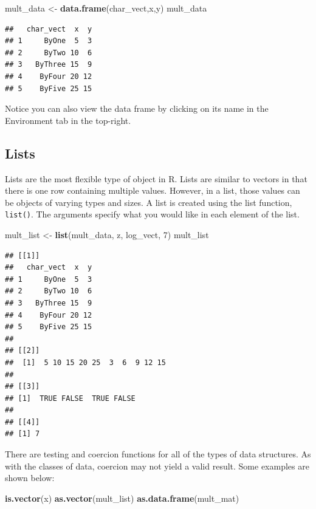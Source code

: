 \documentclass[
]{book}
\newenvironment{Shaded}{\begin{snugshade}}{\end{snugshade}}
\newcommand{\DecValTok}[1]{\textcolor[rgb]{0.00,0.00,0.81}{#1}}
\newcommand{\FunctionTok}[1]{\textcolor[rgb]{0.13,0.29,0.53}{\textbf{#1}}}
\newcommand{\NormalTok}[1]{#1}
\newcommand{\OtherTok}[1]{\textcolor[rgb]{0.56,0.35,0.01}{#1}}
\theoremstyle{definition}
\theoremstyle{definition}
\theoremstyle{definition}
\theoremstyle{definition}
\theoremstyle{remark}
\begin{document}
\begin{Shaded}
\begin{Highlighting}[]
\NormalTok{mult\_data }\OtherTok{\textless{}{-}} \FunctionTok{data.frame}\NormalTok{(char\_vect,x,y)}
\NormalTok{mult\_data}
\end{Highlighting}
\end{Shaded}

\begin{verbatim}
##   char_vect  x  y
## 1     ByOne  5  3
## 2     ByTwo 10  6
## 3   ByThree 15  9
## 4    ByFour 20 12
## 5    ByFive 25 15
\end{verbatim}

Notice you can also view the data frame by clicking on its name in the Environment tab in the top-right.

\hypertarget{lists}{%
\subsection{Lists}\label{lists}}

Lists are the most flexible type of object in R. Lists are similar to vectors in that there is one row containing multiple values. However, in a list, those values can be objects of varying types and sizes. A list is created using the list function, \texttt{list()}. The arguments specify what you would like in each element of the list.

\begin{Shaded}
\begin{Highlighting}[]
\NormalTok{mult\_list }\OtherTok{\textless{}{-}} \FunctionTok{list}\NormalTok{(mult\_data, z, log\_vect, }\DecValTok{7}\NormalTok{)}
\NormalTok{mult\_list}
\end{Highlighting}
\end{Shaded}

\begin{verbatim}
## [[1]]
##   char_vect  x  y
## 1     ByOne  5  3
## 2     ByTwo 10  6
## 3   ByThree 15  9
## 4    ByFour 20 12
## 5    ByFive 25 15
## 
## [[2]]
##  [1]  5 10 15 20 25  3  6  9 12 15
## 
## [[3]]
## [1]  TRUE FALSE  TRUE FALSE
## 
## [[4]]
## [1] 7
\end{verbatim}

There are testing and coercion functions for all of the types of data structures. As with the classes of data, coercion may not yield a valid result. Some examples are shown below:

\begin{Shaded}
\begin{Highlighting}[]
\FunctionTok{is.vector}\NormalTok{(x)}
\FunctionTok{as.vector}\NormalTok{(mult\_list)}
\FunctionTok{as.data.frame}\NormalTok{(mult\_mat)}
\end{Highlighting}
\end{Shaded}
\end{document}
